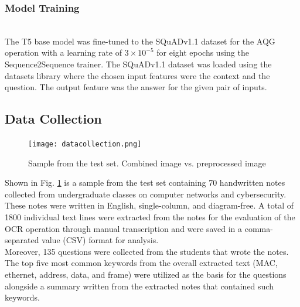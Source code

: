 \documentclass[conference]{IEEEtran}
\begin{document}
\subsubsection{Model Training}
\hfill \\ 
\indent The T5 base model was fine-tuned to the SQuADv1.1 
dataset for the AQG operation with a learning rate of 
$3 \times 10^{-5}$ for eight epochs using the Sequence2Sequence 
trainer. The SQuADv1.1 dataset was loaded using the
datasets library where the chosen input features 
were the context and the question. The output feature 
was the answer for the given pair of inputs.

\newpage

\subsection{Data Collection}
\vspace{-0.2cm}
\begin{figure}[H]
\centerline{\texttt{[image: datacollection.png]}}
\vspace{-0.3cm}
\caption{Sample from the test set. Combined image vs. preprocessed image} 
\label{datacollection}
\end{figure}
\indent Shown in Fig. \ref{datacollection} is a sample 
from the test set containing 70 handwritten notes collected from undergraduate
classes on computer networks and cybersecurity. These notes were
written in English, single-column, and diagram-free. A total of
1800 individual text lines were extracted from the notes for the
evaluation of the OCR operation through manual transcription
and were saved in a comma-separated value (CSV) format for 
analysis. \\
\indent Moreover, 135 questions were collected from the students that wrote the 
notes. The top five most common keywords from the overall extracted text 
(MAC, ethernet, address, data, and frame) were utilized as the basis 
for the questions alongside a summary written from the extracted notes 
that contained such keywords. 
\end{document}
